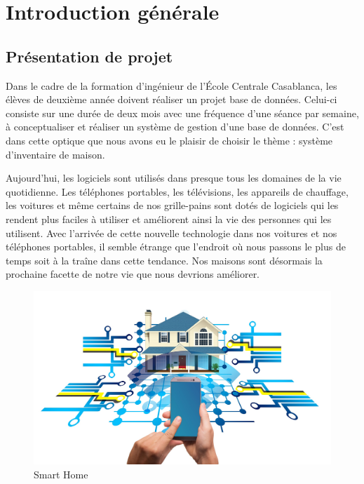 \chapter{Introduction générale} \label{Chapter1}

\section{Présentation de projet}
Dans le cadre de la formation d’ingénieur de l’École Centrale Casablanca, les élèves de deuxième année doivent réaliser un projet base de données. Celui-ci consiste sur une durée de deux mois avec une fréquence d’une séance par semaine, à conceptualiser et réaliser un système de gestion d’une base de données.
C’est dans cette optique que nous avons eu le plaisir de choisir le thème : système d'inventaire de maison.

Aujourd'hui, les logiciels sont utilisés dans presque tous les domaines de la vie quotidienne. Les téléphones portables, les télévisions, les appareils de chauffage, les voitures et même certains de nos grille-pains sont dotés de logiciels qui les rendent plus faciles à utiliser et améliorent ainsi la vie des personnes qui les utilisent.  Avec l'arrivée de cette nouvelle technologie dans nos voitures et nos téléphones portables, il semble étrange que l'endroit où nous passons le plus de temps soit à la traîne dans cette tendance. Nos maisons sont désormais la prochaine facette de notre vie que nous devrions améliorer.

\begin{figure}[ht]
    \centering
    \includegraphics[keepaspectratio=true,scale=0.65]{Figures/smart-home.jpg}
    \caption{Smart Home}
    \label{fig:structure}
\end{figure}

